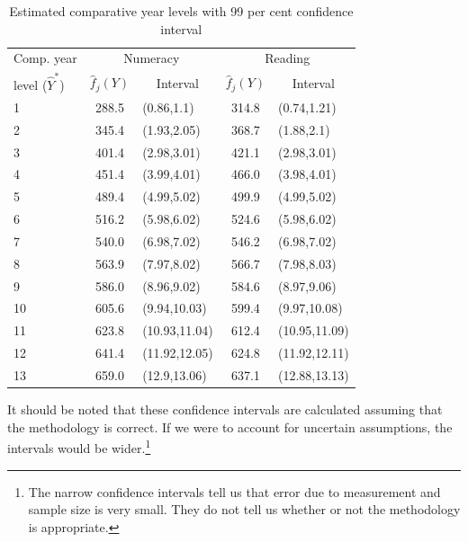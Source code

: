 \begin{table}[h]
  \centering
  \caption{Estimated comparative year levels with 99 per cent confidence interval}
    \begin{tabular}{lclcl}

    Comp. year & \multicolumn{2}{c}{Numeracy} & \multicolumn{2}{c}{Reading} \\
    \cmidrule(lr){2-3} \cmidrule(lr){4-5}
      level ($\widehat{Y}^{*}$) & $\widehat{f}_{j}(Y)$ & \multicolumn{1}{c}{Interval} & $\widehat{f}_{j}(Y)$ & \multicolumn{1}{c}{Interval} \\ \midrule
    1     & 288.5 & (0.86,1.1) & 314.8 & (0.74,1.21) \\
    2     & 345.4 & (1.93,2.05) & 368.7 & (1.88,2.1) \\
    3     & 401.4 & (2.98,3.01) & 421.1 & (2.98,3.01) \\
    4     & 451.4 & (3.99,4.01) & 466.0 & (3.98,4.01) \\
    5     & 489.4 & (4.99,5.02) & 499.9 & (4.99,5.02) \\
    6     & 516.2 & (5.98,6.02) & 524.6 & (5.98,6.02) \\
    7     & 540.0 & (6.98,7.02) & 546.2 & (6.98,7.02) \\
    8     & 563.9 & (7.97,8.02) & 566.7 & (7.98,8.03) \\
    9     & 586.0 & (8.96,9.02) & 584.6 & (8.97,9.06) \\
    10    & 605.6 & (9.94,10.03) & 599.4 & (9.97,10.08) \\
    11    & 623.8 & (10.93,11.04) & 612.4 & (10.95,11.09) \\
    12    & 641.4 & (11.92,12.05) & 624.8 & (11.92,12.11) \\
    13    & 659.0 & (12.9,13.06) & 637.1 & (12.88,13.13) \\
    \bottomrule
    \end{tabular}%
  \label{tab:cyl_ci}%
\begin{flushleft}

\end{flushleft}
\vspace{-6pt}
\end{table}%

It should be noted that these confidence intervals are calculated assuming that the methodology is correct. If we were to account for uncertain assumptions, the intervals would be wider.\footnote{The narrow confidence intervals tell us that error due to measurement and sample size is very small. They do not tell us whether or not the methodology is appropriate.}

